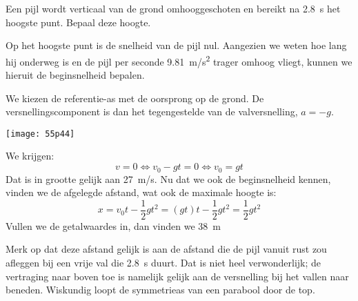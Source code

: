 \documentclass{ximera}
\begin{document}
\begin{exercise}
    Een pijl wordt verticaal van de grond omhooggeschoten en bereikt na \SI{2,8}{s} het hoogste punt. Bepaal deze hoogte.
    \begin{oplossing}
        Op het hoogste punt is de snelheid van de pijl nul. Aangezien we weten hoe lang hij onderweg is en de pijl per seconde \SI{9,81}{m/s^2} trager omhoog vliegt, kunnen we hieruit de beginsnelheid bepalen. 
        
        We kiezen de referentie-as met de oorsprong op de grond. De versnellingscomponent is dan het tegengestelde van de valversnelling, $a=-g$.
        \begin{image}
            \texttt{[image: 55p44]}
        \end{image}
        We krijgen:
        \begin{equation*}
            v=0\Leftrightarrow v_0-gt=0\Leftrightarrow v_0=gt
        \end{equation*}
        Dat is in grootte gelijk aan \SI{27}{m/s}. Nu dat we ook de beginsnelheid kennen, vinden we de afgelegde afstand, wat ook de maximale hoogte is:
        \begin{equation*}
            x=v_0t-\frac{1}{2}gt^2=(gt)t-\frac{1}{2}gt^2=\frac{1}{2}gt^2
        \end{equation*}
        Vullen we de getalwaardes in, dan vinden we \SI{38}{m}

        Merk op dat deze afstand gelijk is aan de afstand die de pijl vanuit rust zou afleggen bij een vrije val die \SI{2,8}{s} duurt. Dat is niet heel verwonderlijk; de vertraging naar boven toe is namelijk gelijk aan de versnelling bij het vallen naar beneden. Wiskundig loopt de symmetrieas van een parabool door de top. 
    \end{oplossing}
\end{exercise}
\end{document}
